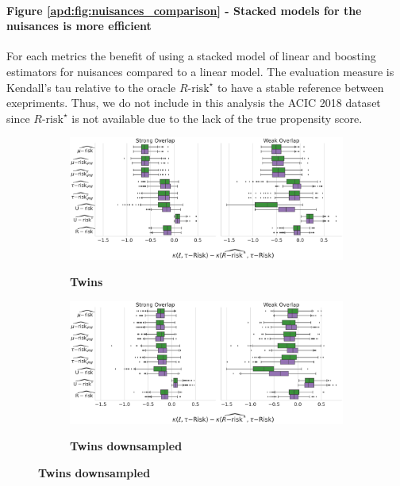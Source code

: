 \documentclass[a4paper,num-refs]{oup-contemporary}%
\begin{document}
\paragraph{Figure \ref{apd:fig:nuisances_comparison} - Stacked models for the nuisances is more efficient}
For each metrics the benefit of
using a stacked model of linear and boosting estimators for nuisances compared
to a linear model. The evaluation measure is Kendall's tau relative to the
oracle $R\text{-risk}^{\star}$ to have a stable reference between exepriments.
Thus, we do not include in this analysis the ACIC 2018 dataset since
$R\text{-risk}^{\star}$ is not available due to the lack of the true propensity
score.

\begin{figure}
    \begin{subfigure}[b]{0.49\textwidth}
        \centering
        \caption{\textbf{Twins}}
        \includegraphics[width=1\textwidth]{_4_nuisance_models_Twins_N11984__ref_oracle_r_risk.pdf}
        \label{fig:experiments:nuisance_comparison:twins}
    \end{subfigure}
    \hfill
    \begin{subfigure}[b]{0.49\textwidth}
        \centering
        \caption{\textbf{Twins downsampled}}
        \includegraphics[width=1\textwidth]{_4_nuisance_models_Twinssmall_N4794__ref_oracle_r_risk.pdf}
        \label{fig:experiments:nuisance_comparison:twins_ds}

\end{subfigure}
\end{figure}
\end{document}
